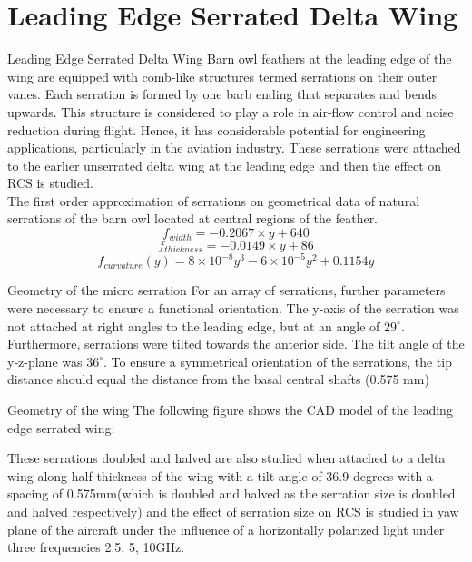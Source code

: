 \documentclass{beamer}
\begin{document}
\section{Leading Edge Serrated Delta Wing}
\begin{frame}{Leading Edge Serrated Delta Wing}
\justifying
Barn owl feathers at the leading edge of the wing are equipped with comb-like structures termed serrations on their outer vanes. Each serration is formed by one barb ending that separates and bends upwards. This structure is considered to play a role in air-flow control and noise reduction during flight. Hence, it has considerable potential for engineering applications, particularly in the aviation industry. These serrations were attached to the earlier unserrated delta wing at the leading edge and then the effect on RCS is studied.\\
The first order approximation of serrations on geometrical data of natural serrations of the barn owl located at central regions of the feather.
$$f_{width} = -0.2067 \times y + 640$$
$$f_{thickness} = -0.0149 \times y + 86$$
$$ f_{curvature}(y) = 8\times10^{-8}y^3 - 6\times10^{-5}y^2 + 0.1154y$$
\end{frame}

\begin{frame}{Geometry of the micro serration}
\justifying
For an array of serrations, further parameters were necessary to ensure a functional orientation. The y-axis of the serration was not attached at right angles to the leading edge, but at an angle of $29^\circ$. Furthermore, serrations were tilted towards the anterior side. The tilt angle of the y-z-plane was $36^\circ$. To ensure a symmetrical orientation of the serrations, the tip distance should equal the distance from the basal central shafts (0.575 mm)

\end{frame}

\begin{frame}{Geometry of the wing}
The following figure shows the CAD model of the leading edge serrated wing:

\justifying
These serrations doubled and halved are also studied when attached to a delta wing along half thickness of the wing with a tilt angle of 36.9 degrees with a spacing of 0.575mm(which is doubled and halved as the serration size is doubled and halved respectively) and the effect of serration size on RCS is studied in yaw plane of the aircraft under the influence of a horizontally polarized light under three frequencies 2.5, 5, 10GHz.
\end{frame}
\end{document}
